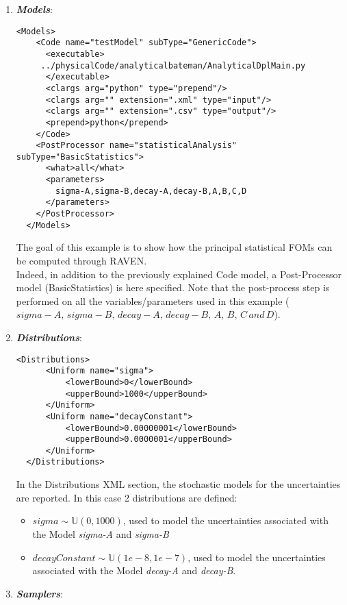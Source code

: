 \begin{enumerate}
   \item \textbf{\textit{Models}}:
\begin{lstlisting}[style=XML,morekeywords={arg,extension,pauseAtEnd,overwrite}]
  <Models>
    <Code name="testModel" subType="GenericCode">
      <executable>
     ../physicalCode/analyticalbateman/AnalyticalDplMain.py
      </executable>
      <clargs arg="python" type="prepend"/>
      <clargs arg="" extension=".xml" type="input"/>
      <clargs arg="" extension=".csv" type="output"/>
      <prepend>python</prepend>
    </Code>
    <PostProcessor name="statisticalAnalysis" subType="BasicStatistics">
      <what>all</what>
      <parameters>
        sigma-A,sigma-B,decay-A,decay-B,A,B,C,D
      </parameters>
    </PostProcessor>
  </Models>
\end{lstlisting}
 The goal of this example is to show how the 
 principal statistical FOMs can be computed through RAVEN.
 \\Indeed, in addition to the previously explained Code 
 model, a Post-Processor model (BasicStatistics) is here specified. 
Note that the post-process step is
performed on all the variables/parameters used in this example ( $sigma-A,\,sigma-B,\, decay-A, \, decay-B,\, A,\, B,\, C \, and \, D$). 
   \item \textbf{\textit{Distributions}}:
\begin{lstlisting}[style=XML]
  <Distributions>
      <Uniform name="sigma">
          <lowerBound>0</lowerBound>
          <upperBound>1000</upperBound>
      </Uniform>
      <Uniform name="decayConstant">
          <lowerBound>0.00000001</lowerBound>
          <upperBound>0.0000001</upperBound>
      </Uniform>
  </Distributions>
\end{lstlisting}
  In the Distributions XML section, the stochastic models for the 
  uncertainties are reported. In 
  this case 2 distributions are defined: 
  \begin{itemize}
    \item $sigma \sim \mathbb{U}(0,1000)$, used to model the uncertainties 
    associated with  the Model \textit{sigma-A} and \textit{sigma-B}
    \item  $decayConstant \sim \mathbb{U}(1e-8,1e-7)$,  used to 
    model the uncertainties 
    associated with  the Model \textit{decay-A} and \textit{decay-B}.
  \end{itemize}
   \item \textbf{\textit{Samplers}}:
\begin{lstlisting}[style=XML,morekeywords={arg,extension,pauseAtEnd,overwrite}]

\end{lstlisting}
\end{enumerate}
